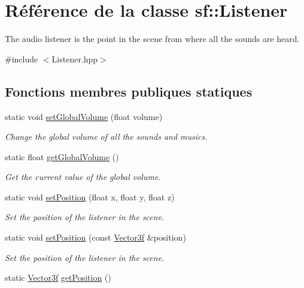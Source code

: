\hypertarget{classsf_1_1Listener}{}\section{Référence de la classe sf\+:\+:Listener}
\label{classsf_1_1Listener}


The audio listener is the point in the scene from where all the sounds are heard.  




{\ttfamily \#include $<$Listener.\+hpp$>$}

\subsection*{Fonctions membres publiques statiques}
\begin{DoxyCompactItemize}
\item 
static void \hyperlink{classsf_1_1Listener_a803a24a1fc04620cacc9f88c6fbc0e3a}{set\+Global\+Volume} (float volume)
\begin{DoxyCompactList}\small\item\em Change the global volume of all the sounds and musics. \end{DoxyCompactList}\item 
static float \hyperlink{classsf_1_1Listener_a137ea535799bdf70be6ec969673d4d33}{get\+Global\+Volume} ()
\begin{DoxyCompactList}\small\item\em Get the current value of the global volume. \end{DoxyCompactList}\item 
static void \hyperlink{classsf_1_1Listener_a5bc2d8d18ea2d8f339d23cbf17678564}{set\+Position} (float x, float y, float z)
\begin{DoxyCompactList}\small\item\em Set the position of the listener in the scene. \end{DoxyCompactList}\item 
static void \hyperlink{classsf_1_1Listener_a28a27d85cfbf8065c535c39176898fcb}{set\+Position} (const \hyperlink{classsf_1_1Vector3}{Vector3f} \&position)
\begin{DoxyCompactList}\small\item\em Set the position of the listener in the scene. \end{DoxyCompactList}\item 
static \hyperlink{classsf_1_1Vector3}{Vector3f} \hyperlink{classsf_1_1Listener_acd7ee65bc948ca38e1c669aa12340c54}{get\+Position} ()

\end{DoxyCompactItemize}
